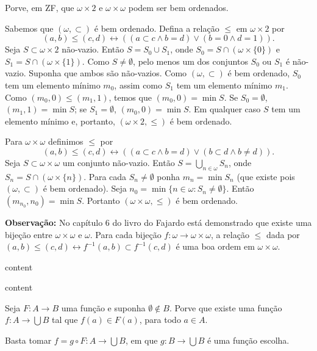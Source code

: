 \begin{exercicio}
	Porve, em ZF, que $\omega\times 2$ e $\omega\times\omega$ podem ser bem ordenados.
\end{exercicio}
\begin{solucao}
	Sabemos que $(\omega,\subset)$ é bem ordenado. Defina a relação $\leq$ em $\omega\times 2$ por
	$$(a,b)\leq(c,d)\leftrightarrow((a\subset c\wedge b=d)\vee(b=0\wedge d=1)).$$
	Seja $S\subset\omega\times 2$ não-vazio. Então $S=S_0\cup S_1$, onde $S_0=S\cap(\omega\times\{0\})$ e $S_1=S\cap(\omega\times \{1\})$. Como $S\neq\emptyset$, pelo menos um dos conjuntos $S_0$ ou $S_1$ é não-vazio. Suponha que ambos são não-vazios. Como $(\omega,\subset)$ é bem ordenado, $S_0$ tem um elemento mínimo $m_0$, assim como $S_1$ tem um elemento mínimo $m_1$. Como $(m_0,0)\leq(m_1,1)$, temos que $(m_0,0)=\min S$. Se $S_0=\emptyset$, $(m_1,1)=\min S$; se $S_1=\emptyset$, $(m_0,0)=\min S$. Em qualquer caso $S$ tem um elemento mínimo e, portanto, $(\omega\times 2,\leq)$ é bem ordenado.
	
	Para $\omega\times\omega$ definimos $\leq$ por
	$$(a,b)\leq(c,d)\leftrightarrow((a\subset c\wedge b=d)\vee(b\subset d\wedge b\neq d)).$$
	Seja $S\subset\omega\times\omega$ um conjunto não-vazio. Então $S=\bigcup_{n\in\omega}S_n$, onde $S_n=S\cap(\omega\times \{n\})$. Para cada $S_n\neq\emptyset$ ponha $m_n=\min S_n$ (que existe pois $(\omega,\subset)$ é bem ordenado). Seja $n_0=\min\{n\in\omega:S_n\neq\emptyset\}$. Então $(m_{n_0},n_0)=\min S$. Portanto $(\omega\times\omega,\leq)$ é bem ordenado.
	
	\noindent\textbf{Observação:} No capítulo 6 do livro do Fajardo está demonstrado que existe uma bijeção entre $\omega\times\omega$ e $\omega$. Para cada bijeção $f:\omega\to\omega\times\omega$, a relação $\leq$ dada por $(a,b)\leq(c,d)\leftrightarrow f^{-1}(a,b)\subset f^{-1}(c,d)$ é uma boa ordem em $\omega\times\omega$.
\end{solucao}

\begin{exercicio}
	content
\end{exercicio}
\begin{solucao}
	content
\end{solucao}

\begin{exercicio}
	Seja $F:A\to B$ uma função e suponha $\emptyset\notin B$. Porve que existe uma função $f:A\to\bigcup B$ tal que $f(a)\in F(a)$, para todo $a\in A$.
\end{exercicio}
\begin{solucao}
	Basta tomar $f=g\circ F:A\to\bigcup B$, em que $g:B\to\bigcup B$ é uma função escolha.
\end{solucao}

